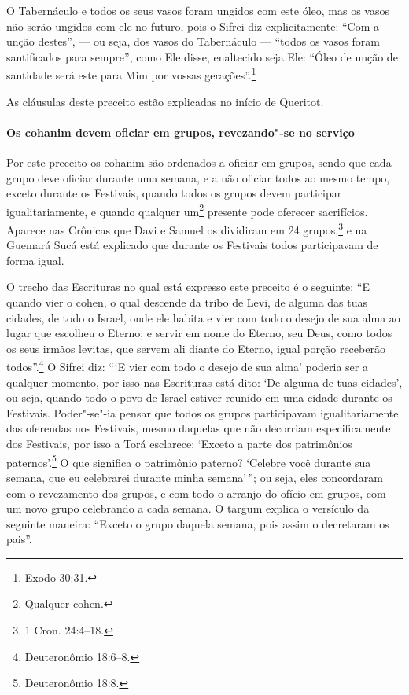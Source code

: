\begin{multicols}{2}
O Tabernáculo e todos os seus vasos foram ungidos com este óleo,
mas os vasos não serão ungidos com ele no futuro, pois o Sifrei\starr{} diz
explicitamente: ``Com a unção destes'', --- ou seja, dos vasos do
Tabernáculo --- ``todos os vasos foram santificados para sempre'', como
Ele disse, enaltecido seja Ele: ``Óleo de unção de santidade será este
para Mim por vossas gerações''.\footnote{Exodo 30:31.}

As cláusulas deste preceito estão explicadas no início de Queritot\starr.

\paragraph{Os cohanim\starr{} devem oficiar em grupos, revezando"-se no serviço}

Por este preceito os cohanim\starr{} são ordenados a oficiar em grupos,
sendo que cada grupo deve oficiar durante uma semana, e a não oficiar
todos ao mesmo tempo, exceto durante os Festivais, quando todos os grupos
devem participar igualitariamente, e quando qualquer
um\footnote{Qualquer cohen\starr.} presente pode oferecer sacrifícios. Aparece nas Crônicas que Davi e Samuel os dividiram em 24 grupos,\footnote{1 Cron. 24:4--18.}
e na Guemará\starr{} Sucá\starr{} está explicado que durante os Festivais todos
participavam de forma igual.

O trecho das Escrituras no qual está expresso este preceito é o
seguinte: ``E quando vier o cohen\starr, o qual descende da tribo de Levi\starr,
de alguma das tuas cidades, de todo o Israel, onde ele habita e vier com
todo o desejo de sua alma ao lugar que escolheu o Eterno; e servir em
nome do Eterno, seu Deus, como todos os seus irmãos levitas\starr, que servem
ali diante do Eterno, igual porção receberão todos''.\footnote{Deuteronômio
18:6--8.} O Sifrei\starr{} diz: ```E vier com todo o desejo de sua alma' poderia ser a qualquer momento, por isso nas
Escrituras está dito: `De alguma de tuas cidades', ou seja, quando todo
o povo de Israel estiver reunido em uma cidade durante os Festivais.
Poder"-se"-ia pensar que todos os grupos participavam igualitariamente das
oferendas nos Festivais, mesmo daquelas que não decorriam
especificamente dos Festivais, por isso a Torá\starr{} esclarece: `Exceto a
parte dos patrimônios paternos'.\footnote{Deuteronômio 18:8.} O que significa o
patrimônio paterno? `Celebre você durante sua semana, que eu celebrarei
durante minha semana'\,''; ou seja, eles concordaram com o revezamento
dos grupos, e com todo o arranjo do ofício em grupos, com um novo grupo
celebrando a cada semana. O targum\starr{} explica o versículo da seguinte
maneira: ``Exceto o grupo daquela semana, pois assim o decretaram os
pais''.


\end{multicols}
